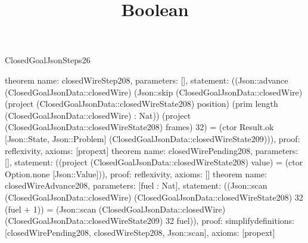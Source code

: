 \begin{lexlean}{ClosedGoalJsonSteps26}
\title{Boolean}
\begin{semanticmodule}
theorem{
 name: closedWireStep208, parameters: [],
 statement: ((Json::advance (ClosedGoalJsonData::closedWire) (Json::skip (ClosedGoalJsonData::closedWire) (project (ClosedGoalJsonData::closedWireState208) position) (prim length (ClosedGoalJsonData::closedWire) : Nat)) (project (ClosedGoalJsonData::closedWireState208) frames) 32) = (ctor Result.ok [Json::State, Json::Problem] (ClosedGoalJsonData::closedWireState209))), proof: reflexivity{}, axioms: [propext]
}
theorem{
 name: closedWirePending208, parameters: [],
 statement: ((project (ClosedGoalJsonData::closedWireState208) value) = (ctor Option.none [Json::Value])), proof: reflexivity{}, axioms: []
}
theorem{
 name: closedWireAdvance208, parameters: [fuel : Nat],
 statement: ((Json::scan (ClosedGoalJsonData::closedWire) (ClosedGoalJsonData::closedWireState208) 32 (fuel + 1)) = (Json::scan (ClosedGoalJsonData::closedWire) (ClosedGoalJsonData::closedWireState209) 32 fuel)), proof: simplify{definitions: [closedWirePending208, closedWireStep208, Json::scan]}, axioms: [propext]
}
\end{semanticmodule}
\end{lexlean}
